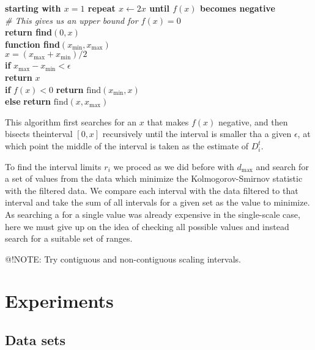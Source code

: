 \documentclass{article}
\begin{document}
\begin{pseudo}[h]
	\textbf{starting with $x = 1$ repeat $x \leftarrow 2x$ until $f(x)$ becomes negative}  \\
	\hspace*{5mm}\textit{\# This gives us an upper bound for $f(x) = 0$}\\
	\textbf{return find}$(0, x)$ \\
	
	\textbf{function find}$(x_{\min}, x_{\max})$ \\
	\hspace*{5mm} $x = (x_{\max} + x_{\min})/2$ \\
	\hspace*{5mm} \textbf{if} $x_{\max} - x_{\min} < \epsilon$ \\
	\hspace*{10mm} \textbf{return} $x$\\
	\hspace*{5mm} \textbf{if} $f(x) < 0$
	\textbf{return} $\mbox{find}(x_{\min}, x)$ \\ 
	\hspace*{5mm} \textbf{else} 
 	\textbf{return} $\mbox{find}(x, x_{\max})$ \\	
\end{pseudo}

This algorithm first searches for an $x$ that makes $f(x)$ negative, and then bisects theinterval $[0, x]$ recursively until the interval is smaller tha a given $\epsilon$, at which point the middle of the interval is taken as the estimate of $D_i^t$.

To find the interval limits $r_i$ we proced as we did before with $d_{\max}$ and search for a set of values from the data which minimize the Kolmogorov-Smirnov statistic with the filtered data. We compare each interval with the data filtered to that interval and take the sum of all intervals for a given set as the value to minimize. As searching a for a single value was already expensive in the single-scale case, here we must give up on the idea of checking all possible values and instead search for a suitable set of ranges.  

@!NOTE: Try contiguous and non-contiguous scaling intervals. 


\section{Experiments}
\subsection{Data sets}
\end{document}
